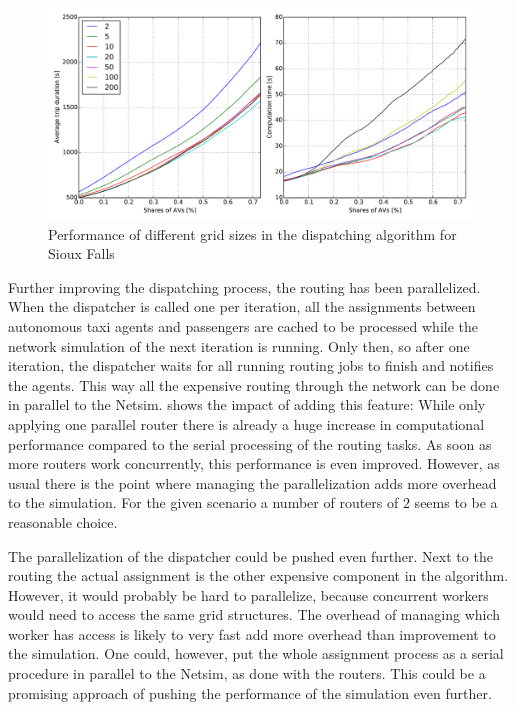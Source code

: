 \begin{figure}
    \centering
    \includegraphics[width=1.0\textwidth]{figures/gridsize.pdf}
    \caption{Performance of different grid sizes in the dispatching algorithm for Sioux Falls}
    \label{fig:gridsize}
\end{figure}

Further improving the dispatching process, the routing has been parallelized. When
the dispatcher is called one per iteration, all the assignments between autonomous
taxi agents and passengers are cached to be processed while the network simulation
of the next iteration is running. Only then, so after one iteration, the dispatcher
waits for all running routing jobs to finish and notifies the agents. This way all
the expensive routing through the network can be done in parallel to the Netsim.
 shows the impact of adding this feature: While only applying
one parallel router there is already a huge increase in computational performance
compared to the serial processing of the routing tasks. As soon as more routers
work concurrently, this performance is even improved. However, as usual there is
the point where managing the parallelization adds more overhead to the simulation.
For the given scenario a number of routers of $2$ seems to be a reasonable choice.

The parallelization of the dispatcher could be pushed even further. Next to the
routing the actual assignment is the other expensive component in the algorithm.
However, it would probably be hard to parallelize, because concurrent workers
would need to access the same grid structures. The overhead of managing which
worker has access is likely to very fast add more overhead than improvement to
the simulation. One could, however, put the whole assignment process as a serial
procedure in parallel to the Netsim, as done with the routers. This could be a
promising approach of pushing the performance of the simulation even further.

